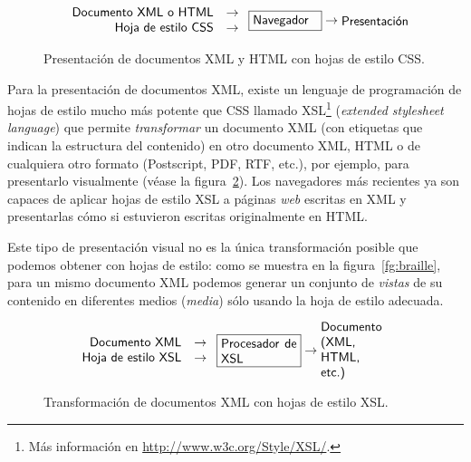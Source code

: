 \begin{figure} $$ \left. \begin{array}{rcl} \mbox{\textsf{Documento XML o HTML}} &\to \\ \mbox{\textsf{Hoja de estilo CSS}} &\to \\ \end{array} \right. \mbox{\framebox{\parbox{1.8cm}{\textsf{Navegador}}}} \to \mbox{\parbox{1.8cm}{\textsf{Presentación}}} $$ \caption{Presentación de documentos XML y HTML con hojas de estilo CSS.} \label{fg:CSS} \end{figure} 

Para la presentación de documentos XML, existe un lenguaje de programación de hojas de estilo mucho más potente que CSS llamado XSL\footnote{Más información en \url{http://www.w3c.org/Style/XSL/}.} (\emph{extended stylesheet language}) que permite \emph{transformar} un documento XML (con etiquetas que  indican la estructura del contenido) en otro documento XML, HTML o de cualquiera otro formato (Postscript, PDF, RTF, etc.), por ejemplo, para presentarlo visualmente (véase la figura~\ref{fg:XSL}). Los navegadores más recientes ya son capaces de aplicar hojas de estilo XSL a páginas \emph{web} escritas en XML y presentarlas cómo si estuvieron escritas originalmente en HTML. 

Este tipo de presentación visual no es la única transformación posible que podemos obtener con hojas de estilo: como se muestra en la figura~\ref{fg:braille}, para un mismo documento XML podemos generar un conjunto de \emph{vistas} de su contenido en diferentes medios (\emph{media}) sólo usando la hoja de estilo adecuada. 

\begin{figure} $$ \left. \begin{array}{rcl} \mbox{\textsf{Documento XML}} &\to \\ \mbox{\textsf{Hoja de estilo XSL}} &\to \\ \end{array} \right. \mbox{\framebox{\parbox{2.1cm}{\textsf{Procesador de XSL}}}} \to \mbox{\parbox{2.1cm}{\textsf{Documento (XML, HTML, etc.) }}} $$ \caption{Transformación de documentos XML con hojas de estilo XSL.} \label{fg:XSL} \end{figure} 

